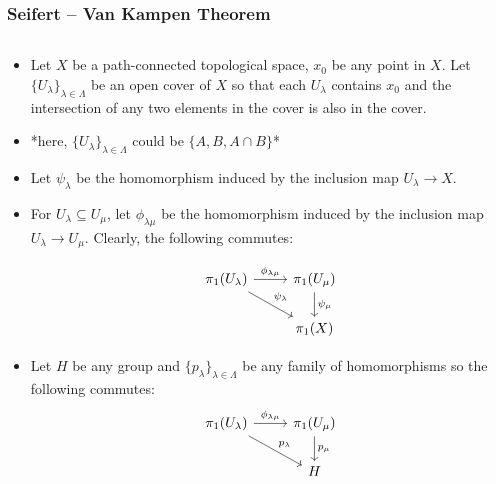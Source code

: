 \documentclass[8pt]{beamer}
\begin{document}
  \begin{frame}
    \frametitle{Seifert -- Van Kampen Theorem}
    \begin{columns}
      \begin{column}[T]{0.5\textwidth}
        \begin{itemize}
          \item Let $X$ be a path-connected topological space, $x_0$ be any point
            in $X$. Let $\{U_\lambda\}_{\lambda \in \Lambda}$ be an open cover
            of $X$ so that each $U_\lambda$ contains $x_0$ and the intersection
            of any two elements in the cover is also in the cover.
          \item *here, $\{U_\lambda\}_{\lambda \in \Lambda}$ could be $\{A, B,
            A \cap B\}$*
          \item Let $\psi_\lambda$ be the homomorphism induced by the inclusion
                map $U_\lambda \rightarrow X$.
          \item
            \begin{minipage}[t]{0.5\textwidth}
              \vspace{-5.5mm}
              For $U_\lambda \subseteq U_\mu$, let $\phi_{\lambda\mu}$ be the
              homomorphism induced by the inclusion map $U_\lambda \rightarrow
              U_\mu$. Clearly, the following commutes:
            \end{minipage}%
            \begin{minipage}[t]{0.5\textwidth}
              \centering
              \vspace{-12mm}
                \[\begin{tikzcd}[ampersand replacement=\&]
                  \pi_1(U_\lambda) \ar[rd, "\psi_\lambda"]
                  \ar[r,"\phi_{\lambda\mu}"] \& \pi_1(U_\mu) \ar[d, "\psi_\mu"]
                  \\ \& \pi_1(X)
                  \end{tikzcd}\]
            \end{minipage}
          \item Let $H$ be any group and $\{p_\lambda\}_{\lambda \in \Lambda}$
            be any family of homomorphisms so the following commutes:
            \[\begin{tikzcd}[ampersand replacement=\&]
              \pi_1(U_\lambda) \ar[rd, "p_\lambda"]
              \ar[r,"\phi_{\lambda\mu}"] \& \pi_1(U_\mu) \ar[d, "p_\mu"]\\
                  \& H
              \end{tikzcd}\]

\end{itemize}
\end{column}
\end{columns}
\end{frame}
\end{document}
